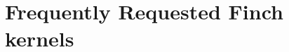 \documentclass[acmsmall,screen,review,anonymous]{acmart}
\begin{document}




\appendix

\section{Frequently Requested Finch kernels}
\end{document}
